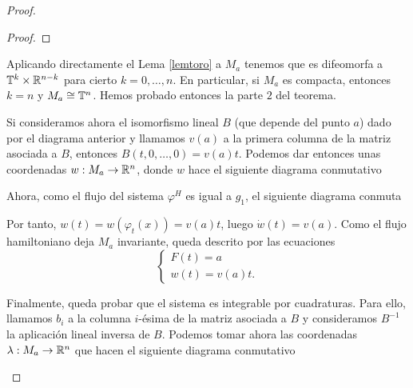 \begin{proof}
\begin{proof}
\end{proof}

Aplicando directamente el Lema \ref{lemtoro} a $M_a$ tenemos que es difeomorfa a $\mathbb{T}^k\times \mathbb{R}^{n-k}$ para cierto $k=0,\dots,n$. En particular, si $M_a$ es compacta, entonces $k=n$ y $M_a\cong \mathbb{T}^n$. Hemos probado entonces la parte $2$ del teorema.

Si consideramos ahora el isomorfismo lineal $B$ (que depende del punto $a$) dado por el diagrama anterior y llamamos $v(a)$ a la primera columna de la matriz asociada a $B$, entonces $B(t,0,\dots,0)=v(a)t$. Podemos dar entonces unas coordenadas $w:M_a\rightarrow \mathbb{R}^n$, donde $w$ hace el siguiente diagrama conmutativo
\begin{center}
\end{center}

Ahora, como el flujo del sistema $\varphi^H$ es igual a $g_1$, el siguiente diagrama conmuta
\begin{center}
 \end{center}
 Por tanto, $w(t)=w(\varphi_t(x))=v(a) t$, luego $\dot w(t)=v(a)$. Como el flujo hamiltoniano deja $M_a$ invariante, queda descrito por las ecuaciones
 \begin{equation*}
   \begin{cases}
     F(t)=a \\
     w(t)=v(a)t.
   \end{cases}
 \end{equation*}

 Finalmente, queda probar que el sistema es integrable por cuadraturas. Para ello, llamamos $b_i$ a la columna $i$-ésima de la matriz asociada a $B$ y consideramos $B^{-1}$ la aplicación lineal inversa de $B$. Podemos tomar ahora las coordenadas $\lambda:M_a\rightarrow \mathbb{R}^n$ que hacen el siguiente diagrama conmutativo
 \begin{center}
 \end{center}


\end{proof}
